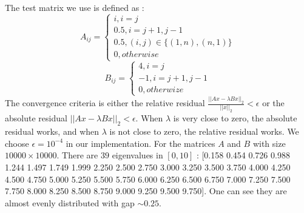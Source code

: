 \label{sec:results}

The test matrix we use is defined as :
\[
A_{ij} =
\begin{cases}
i, i =j \\
0.5, i = j+1, j-1 \\
0.5, (i, j) \in \{(1, n), (n,1)\} \\
0, otherwise
\end{cases}
\]
\[
B_{ij} = 
\begin{cases}
4, i = j \\
-1, i = j+1, j-1 \\
0, otherwize
\end{cases}
\]
The convergence criteria is either the relative residual $\frac{||Ax-\lambda B x||_2}{||x||_2} < \epsilon$ or the absolute residual $||Ax-\lambda B x||_2 < \epsilon$. When $\lambda$ is very close to zero, the absolute residual works, and when $\lambda$ is not close to zero, the relative residual works. We choose $\epsilon = 10^{-4}$ in our implementation. For the matrices $A$ and $B$ with size $10000 \times 10000$. There are $39$ eigenvalues in $[0, 10]$ : [0.158 0.454 0.726 0.988 1.244 1.497 1.749 1.999 2.250 2.500 2.750 3.000 3.250 3.500 3.750 4.000 4.250 4.500 4.750 5.000 5.250 5.500 5.750 6.000 6.250 6.500 6.750 7.000 7.250 7.500 7.750 8.000 8.250 8.500 8.750 9.000 9.250 9.500 9.750]. One can see they are almost evenly distributed with gap $\sim 0.25$.


